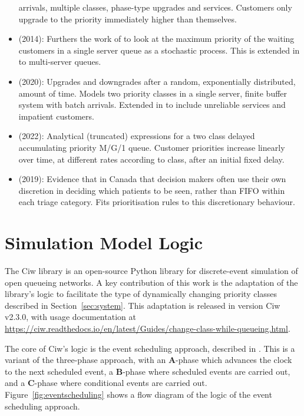 \documentclass{article}
\begin{document}
\begin{itemize}
      arrivals, multiple classes, phase-type upgrades and services.
        Customers only upgrade to the priority immediately higher than
        themselves.
  \item \cite{stanford14} (2014): Furthers the work of \cite{kleinrock164} to
      look at the maximum priority of the waiting customers in a single server
        queue as a stochastic process. This is extended in \cite{sharif14} to
        multi-server queues.
  \item \cite{klimenok20} (2020): Upgrades and downgrades after a random,
      exponentially distributed, amount of time. Models two priority classes
        in a single server, finite buffer system with batch arrivals. Extended
        in \cite{dudin21} to include unreliable services and impatient
        customers. 
  \item \cite{bilodeau22} (2022): Analytical (truncated) expressions for
      a two class delayed accumulating priority M/G/1 queue. Customer
        priorities increase linearly over time, at different rates
        according to class, after an initial fixed delay.
\end{itemize}


\begin{itemize}
  \item \cite{ding19} (2019): Evidence that in Canada that decision makers
      often use their own discretion in deciding which patients to be seen,
        rather than FIFO within each triage category. Fits prioritisation rules
        to this discretionary behaviour.
\end{itemize}


\section{Simulation Model Logic}\label{sec:simulation}
The Ciw library \cite{palmer19} is an open-source Python library for
discrete-event simulation of open queueing networks. A key contribution of this
work is the adaptation of the library's logic to facilitate the type of
dynamically changing priority classes described in Section~\ref{sec:system}.
This adaptation is released in version Ciw v2.3.0, with usage documentation at
\url{https://ciw.readthedocs.io/en/latest/Guides/change-class-while-queueing.html}.

The core of Ciw's logic is the event scheduling approach, described in
\cite{robinson14}. This is a variant of the three-phase approach, with an
\textbf{A}-phase which advances the clock to the next scheduled event, a
\textbf{B}-phase where scheduled events are carried out, and a \textbf{C}-phase
where conditional events are carried out. Figure~\ref{fig:eventscheduling} shows
a flow diagram of the logic of the event scheduling approach.
\end{document}
